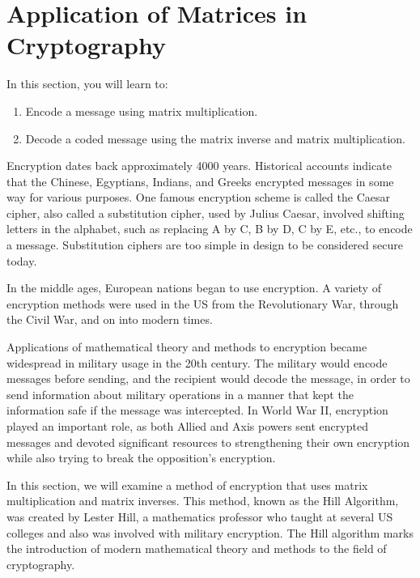 \section{Application of Matrices in Cryptography}

In this section, you will learn to:

\begin{enumerate}
    \item Encode a message using matrix multiplication.
    \item Decode a coded message using the matrix inverse and matrix multiplication.
\end{enumerate}

Encryption dates back approximately 4000 years. Historical accounts indicate that the Chinese, Egyptians, Indians, and Greeks encrypted messages in some way for various purposes. One famous encryption scheme is called the Caesar cipher, also called a substitution cipher, used by Julius Caesar, involved shifting letters in the alphabet, such as replacing A by C, B by D, C by E, etc., to encode a message. Substitution ciphers are too simple in design to be considered secure today.

In the middle ages, European nations began to use encryption. A variety of encryption methods were used in the US from the Revolutionary War, through the Civil War, and on into modern times.

Applications of mathematical theory and methods to encryption became widespread in military usage in the 20th century. The military would encode messages before sending, and the recipient would decode the message, in order to send information about military operations in a manner that kept the information safe if the message was intercepted. In World War II, encryption played an important role, as both Allied and Axis powers sent encrypted messages and devoted significant resources to strengthening their own encryption while also trying to break the opposition’s encryption.

In this section, we will examine a method of encryption that uses matrix multiplication and matrix inverses. This method, known as the Hill Algorithm, was created by Lester Hill, a mathematics professor who taught at several US colleges and also was involved with military encryption. The Hill algorithm marks the introduction of modern mathematical theory and methods to the field of cryptography.

